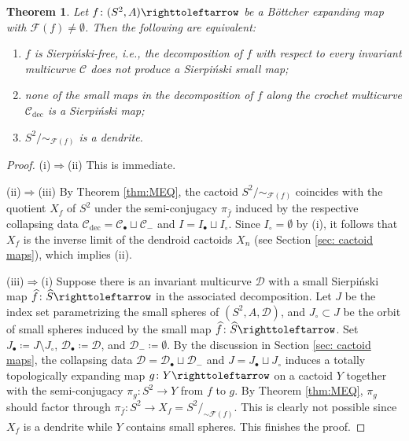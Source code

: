 \documentclass{amsart}
\theoremstyle{plain}
\newtheorem{theorem}{Theorem}[section]
\theoremstyle{definition}
\theoremstyle{remark}
\renewcommand{\phi}{\varphi}
\newcommand{\Fat}{{\mathcal F}}
\newcommand{\Jul}{{\mathcal J}}
\newcommand{\JC}{{\mathcal J}}
\newcommand{\CC}{{\mathcal C}}
\newcommand{\DD}{{\mathcal D}}
\newcommand\selfmap{\righttoleftarrow}
\newcommand{\cro}{{\operatorname{dec}}}
\begin{document}
\begin{theorem}\label{thm:sierpinski-free}
Let $f\colon(S^2,A)\selfmap$ be a B\"ottcher expanding map with $\Fat(f)\not=\emptyset$. %
Then the following are equivalent:
\begin{enumerate}[label=\text{(\roman*)},font=\normalfont,leftmargin=*]
\item $f$ is Sierpi\'{n}ski-free, i.e., the decomposition of $f$ with respect to every invariant multicurve $\CC$ does not produce a Sierpi\'{n}ski small map;
\item none of the small maps in the decomposition of $f$ along the crochet multicurve $\CC_\cro$ is a Sierpi\'{n}ski map;
\item $S^2/{\sim_{\Fat(f)}}$ is a dendrite.
\end{enumerate}
\end{theorem}
\begin{proof}
(i)$\Rightarrow$(ii) This is immediate.

(ii)$\Rightarrow$(iii) By Theorem \ref{thm:MEQ}, the cactoid $S^2/{\sim_{\Fat(f)}}$ coincides with the quotient $X_f$ of $S^2$ under the semi-conjugacy $\pi_{\bar f}$ induced by the respective collapsing data $\CC_\cro = \CC_\bullet\sqcup \CC_-$ and $I=I_\bullet\sqcup I_\circ$. Since $I_\circ=\emptyset$ by (i), it follows that $X_f$ is the inverse limit of the dendroid cactoids $X_n$ (see Section \ref{sec: cactoid maps}), which implies (ii).

(iii)$\Rightarrow$(i) Suppose there is an invariant multicurve $\DD$ with a small Sierpi\'{n}ski map $\widehat f \colon \widehat S\selfmap$ in the associated decomposition. Let $J$ be the index set parametrizing the small spheres of $(S^2,A,\DD)$, and $J_\circ\subset J$ be the orbit of small spheres induced by the small map $\widehat f \colon  \widehat S\selfmap$. %
Set $J_\bullet \coloneq J\setminus J_\circ$, $\DD_\bullet \coloneq \DD$, and $\DD_- \coloneq \emptyset$. By the discussion in Section \ref{sec: cactoid maps}, the collapsing data $\DD= \DD_\bullet\sqcup \DD_-$ and $J=J_\bullet\sqcup J_\circ$  induces 
a totally topologically expanding map $g \colon Y\selfmap $ on a cactoid $Y$ together with the semi-conjugacy $\pi_{g}\colon S^2\to Y$ from $f$ to $g$. By Theorem \ref{thm:MEQ}, $\pi_g$ should factor through $\pi_{\bar f}\colon S^2\to X_f=S^2/_{\sim \Fat(f)}$. This is clearly not possible since $X_f$ is a dendrite while $Y$ contains small spheres. This finishes the proof.
\end{proof}
\end{document}
